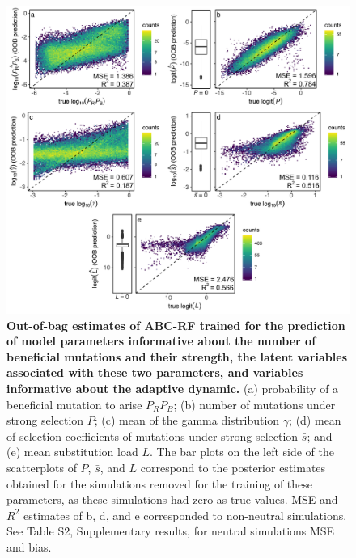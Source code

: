 \documentclass[a4paper, 12pt]{article}
\begin{document}
\begin{figure}[ht]
  \centering
  \includegraphics[width=1\textwidth]{Figures/FigureS2_oob_plots_selection.pdf}
  \small\caption{\textbf{Out-of-bag estimates of ABC-RF trained for the prediction of model parameters informative about the number of beneficial mutations and their strength, the latent variables associated with these two parameters, and variables informative about the adaptive dynamic.} (a) probability of a beneficial mutation to arise $P_RP_B$; (b) number of mutations under strong selection $P$; (c)  mean of the gamma distribution $\gamma$; (d) mean of selection coefficients of mutations under strong selection $\bar{s}$; and (e) mean substitution load $L$. The bar plots on the left side of the scatterplots of $P$, $\bar{s}$, and $L$ correspond to the posterior estimates obtained for the simulations removed for the training of these parameters, as these simulations had zero as true values. MSE and $R^2$ estimates of b, d, and e corresponded to non-neutral simulations. See Table S2, Supplementary results, for neutral simulations MSE and bias.}
  \label{fig:supple_oob_sel}
\end{figure}
\end{document}
